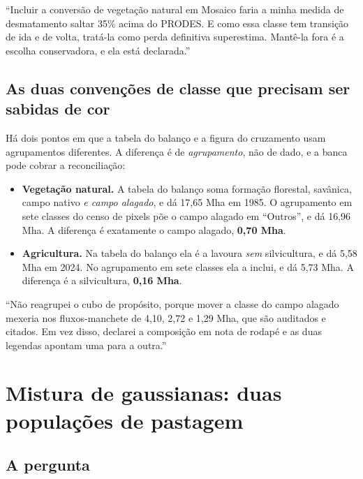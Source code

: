 \begin{nabanca}
``Incluir a conversão de vegetação natural em Mosaico faria a minha medida de
desmatamento saltar 35\% acima do PRODES. E como essa classe tem transição de
ida e de volta, tratá-la como perda definitiva superestima. Mantê-la fora é a
escolha conservadora, e ela está declarada.''
\end{nabanca}

\section{As duas convenções de classe que precisam ser sabidas de cor}

Há dois pontos em que a tabela do balanço e a figura do cruzamento usam
agrupamentos diferentes. A diferença é de \emph{agrupamento}, não de dado, e a
banca pode cobrar a reconciliação:

\begin{itemize}
\item \textbf{Vegetação natural.} A tabela do balanço soma formação florestal,
savânica, campo nativo \emph{e campo alagado}, e dá 17,65 Mha em 1985. O
agrupamento em sete classes do censo de pixels põe o campo alagado em
``Outros'', e dá 16,96 Mha. A diferença é exatamente o campo alagado,
\textbf{0,70 Mha}.
\item \textbf{Agricultura.} Na tabela do balanço ela é a lavoura \emph{sem}
silvicultura, e dá 5,58 Mha em 2024. No agrupamento em sete classes ela a
inclui, e dá 5,73 Mha. A diferença é a silvicultura, \textbf{0,16 Mha}.
\end{itemize}

\begin{nabanca}
``Não reagrupei o cubo de propósito, porque mover a classe do campo alagado
mexeria nos fluxos-manchete de 4,10, 2,72 e 1,29 Mha, que são auditados e
citados. Em vez disso, declarei a composição em nota de rodapé e as duas
legendas apontam uma para a outra.''
\end{nabanca}

\chapter{Mistura de gaussianas: duas populações de pastagem}
\label{cap:mistura}

\section{A pergunta}

